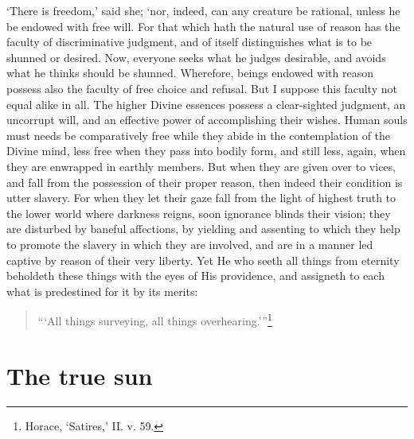 \documentclass[12pt]{book}
\begin{document}
`There is freedom,' said she; `nor, indeed, can any creature be
rational, unless he be endowed with free will. For that which hath the
natural use of reason has the faculty of discriminative judgment, and of
itself distinguishes what is to be shunned or desired. Now, everyone
seeks what he judges desirable, and avoids what he thinks should be
shunned. Wherefore, beings endowed with reason possess also the faculty
of free choice and refusal. But I suppose this faculty not equal alike
in all. The higher Divine essences possess a clear-sighted judgment, an
uncorrupt will, and an effective power of accomplishing their wishes.
Human souls must needs be comparatively free while they abide in the
contemplation of the Divine mind, less free when they pass into bodily
form, and still less, again, when they are enwrapped in earthly members.
But when they are given over to vices, and fall from the possession of
their proper reason, then indeed their condition is utter slavery. For
when they let their gaze fall from the light of highest truth to the
lower world where darkness reigns, soon ignorance blinds their vision;
they are disturbed by baneful affections, by yielding and assenting to
which they help to promote the slavery in which they are involved, and
are in a manner led captive by reason of their very liberty. Yet He who
seeth all things from eternity beholdeth these things with the eyes of
His providence, and assigneth to each what is predestined for it by its
merits:

\begin{quote}
  ```All things surveying, all things overhearing.'''\footnote{Horace, ‘Satires,’ II. v. 59.}
\end{quote}



\section{The true sun}
\end{document}
